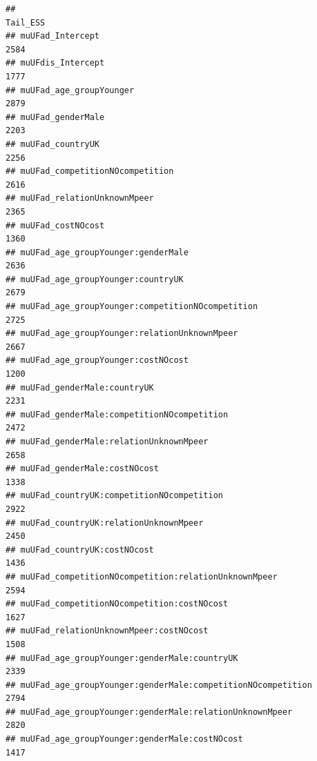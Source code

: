 \documentclass[
]{article}
\begin{document}
\begin{verbatim}
##                                                                                   Tail_ESS
## muUFad_Intercept                                                                      2584
## muUFdis_Intercept                                                                     1777
## muUFad_age_groupYounger                                                               2879
## muUFad_genderMale                                                                     2203
## muUFad_countryUK                                                                      2256
## muUFad_competitionNOcompetition                                                       2616
## muUFad_relationUnknownMpeer                                                           2365
## muUFad_costNOcost                                                                     1360
## muUFad_age_groupYounger:genderMale                                                    2636
## muUFad_age_groupYounger:countryUK                                                     2679
## muUFad_age_groupYounger:competitionNOcompetition                                      2725
## muUFad_age_groupYounger:relationUnknownMpeer                                          2667
## muUFad_age_groupYounger:costNOcost                                                    1200
## muUFad_genderMale:countryUK                                                           2231
## muUFad_genderMale:competitionNOcompetition                                            2472
## muUFad_genderMale:relationUnknownMpeer                                                2658
## muUFad_genderMale:costNOcost                                                          1338
## muUFad_countryUK:competitionNOcompetition                                             2922
## muUFad_countryUK:relationUnknownMpeer                                                 2450
## muUFad_countryUK:costNOcost                                                           1436
## muUFad_competitionNOcompetition:relationUnknownMpeer                                  2594
## muUFad_competitionNOcompetition:costNOcost                                            1627
## muUFad_relationUnknownMpeer:costNOcost                                                1508
## muUFad_age_groupYounger:genderMale:countryUK                                          2339
## muUFad_age_groupYounger:genderMale:competitionNOcompetition                           2794
## muUFad_age_groupYounger:genderMale:relationUnknownMpeer                               2820
## muUFad_age_groupYounger:genderMale:costNOcost                                         1417

\end{verbatim}
\end{document}

